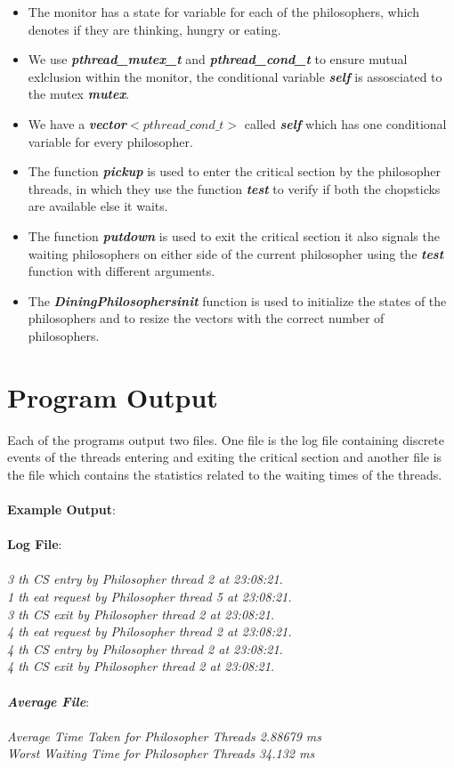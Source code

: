 \documentclass[a4paper,12pt]{report}
\begin{document}
\begin{itemize}
\begin{itemize}
\item The monitor has a state for variable for each of the philosophers, which denotes if they are thinking, hungry or eating.
\item We use \textbf{\textit{pthread\_mutex\_t}} and \textbf{\textit{pthread\_cond\_t}} to ensure mutual exlclusion within the monitor, the conditional variable \textbf{\textit{self}} is assosciated to the mutex \textbf{\textit{mutex}}.
\item We have a \textit{\textbf{vector$<pthread\_cond\_t>$}} called \textbf{\textit{self}} which has one conditional variable for every philosopher.
\item The function \textbf{\textit{pickup}} is used to enter the critical section by the philosopher threads, in which they use the function \textit{\textbf{test}} to verify if both the chopsticks are available else it waits.
\item The function \textit{\textbf{putdown}} is used to exit the critical section it also signals the waiting philosophers on either side of the current philosopher using the \textit{\textbf{test}} function with different arguments.
\item The \textit{\textbf{DiningPhilosophersinit}} function is used to initialize the states of the philosophers and to resize the vectors with the correct number of philosophers.	
\end{itemize}
\end{itemize}
\newpage
\section{Program Output}
Each of the programs output two files. One file is the log file containing discrete events of the threads entering and exiting the critical section and another file is the file which contains the statistics related to the waiting times of the threads.\\\\
\textbf{Example Output}:\\\\
\textbf{Log File}:\\\\
\textit{3 th CS entry by Philosopher thread 2 at 23:08:21.\\
1 th eat request by Philosopher thread 5 at 23:08:21.\\
3 th CS exit by Philosopher thread 2 at 23:08:21.\\
4 th eat request by Philosopher thread 2 at 23:08:21.\\
4 th CS entry by Philosopher thread 2 at 23:08:21.\\
4 th CS exit by Philosopher thread 2 at 23:08:21.\\}\\
\textit{\textbf{Average File}}:\\\\
\textit{Average Time Taken for Philosopher Threads 2.88679 ms\\
Worst Waiting Time for Philosopher Threads 34.132 ms\\
}
\end{document}
